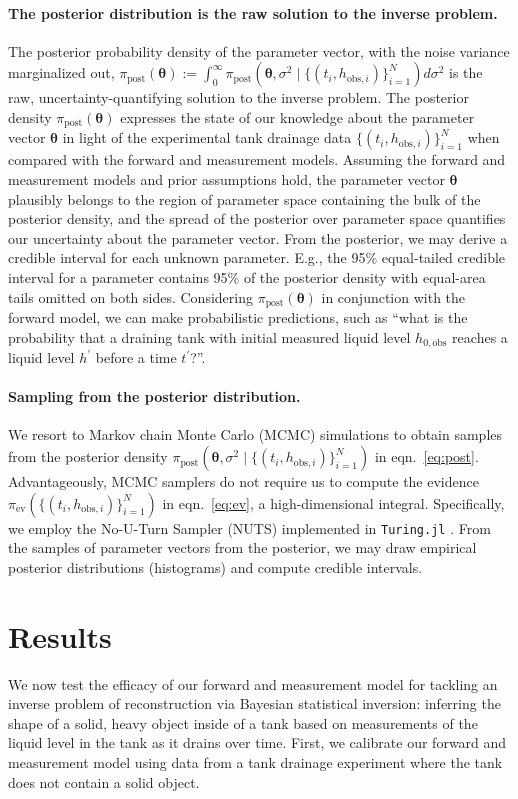 \documentclass[openacc]{rsproca_new}%
\newcommand\thedata {$\{(t_i,h_{\text{obs}, i})\}_{i=1}^{N}$\xspace}
\newcommand\thedatanomath {\{(t_i,h_{\text{obs}, i})\}_{i=1}^{N}}
\begin{document}
\paragraph{The posterior distribution is the raw solution to the inverse problem.}
The posterior probability density of the parameter vector, with the noise variance marginalized out, $\pi_{\text{post}}(\boldsymbol\theta):= \int_0^\infty \pi_{\text{post}}(\boldsymbol \theta, \sigma^2 \mid \thedatanomath) d\sigma^2$ is the raw, uncertainty-quantifying solution to the inverse problem.
The posterior density $\pi_{\text{post}}(\boldsymbol\theta)$ expresses the state of our knowledge about the parameter vector $\boldsymbol \theta$ in light of the experimental tank drainage data \thedata when compared with the forward and measurement models. Assuming the forward and measurement models and prior assumptions hold, the parameter vector $\boldsymbol \theta$ plausibly belongs to the region of parameter space containing the bulk of the posterior density, and the spread of the posterior over parameter space quantifies our uncertainty about the parameter vector. 
From the posterior, we may derive a credible interval for each unknown parameter. E.g., the 95\% equal-tailed credible interval for a parameter contains 95\% of the posterior density with equal-area tails omitted on both sides. 
Considering $\pi_{\text{post}}(\boldsymbol\theta)$ in conjunction with the forward model, we can make probabilistic predictions, such as ``what is the probability that a draining tank with initial measured liquid level $h_{0, \text{obs}}$ reaches a liquid level $h^\prime$ before a time $t^\prime$?''.

\paragraph{Sampling from the posterior distribution.} We resort to Markov chain Monte Carlo (MCMC) simulations to obtain samples from the posterior density $\pi_{\text{post}}(\boldsymbol \theta, \sigma^2 \mid \thedatanomath)$ in eqn.~\ref{eq:post}. Advantageously, MCMC samplers do not require us to compute the evidence $\pi_{\text{ev}}(\thedatanomath)$ in eqn.~\ref{eq:ev}, a high-dimensional integral. Specifically, we employ the No-U-Turn Sampler (NUTS) \cite{hoffman2014no} implemented in \texttt{Turing.jl} \cite{ge2018turing}. From the samples of parameter vectors from the posterior, we may draw empirical posterior distributions (histograms) and compute credible intervals.


\section{Results}
We now test the efficacy of our forward and measurement model for tackling an inverse problem of reconstruction via Bayesian statistical inversion: inferring the shape of a solid, heavy object inside of a tank based on measurements of the liquid level in the tank as it drains over time. 
First, we calibrate our forward and measurement model using data from a tank drainage experiment where the tank does not contain a solid object.
\end{document}
